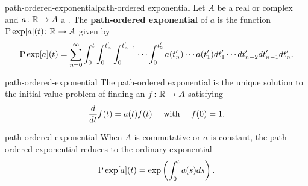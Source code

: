 \begin{topic}{path-ordered-exponential}{path-ordered exponential}
    Let $A$ be a real or complex  and $a \colon \mathbb{R} \to A$ a . The \textbf{path-ordered exponential} of $a$ is the function $\textup{P} \exp [a](t) \colon \mathbb{R} \to A$ given by
    \[ \textup{P} \exp [a] (t) = \sum_{n = 0}^\infty \int_0^t \int_0^{t'_n} \int_0^{t'_{n - 1}} \cdots \int_0^{t'_2} a(t'_n) \cdots a(t'_1) d t'_1 \cdots d t'_{n - 2} d t'_{n - 1} d t'_n . \]
\end{topic}

\begin{example}{path-ordered-exponential}
    The path-ordered exponential is the unique solution to the initial value problem of finding an $f \colon \mathbb{R} \to A$ satisfying
    \[ \frac{d}{dt} f(t) = a(t) f(t) \quad \textup{ with } \quad f(0) = 1 . \]
\end{example}

\begin{example}{path-ordered-exponential}
    When $A$ is commutative or $a$ is constant, the path-ordered exponential reduces to the ordinary exponential
    \[ \textup{P} \exp[a](t) = \exp \left( \int_0^t a(s) ds \right) . \]
\end{example}